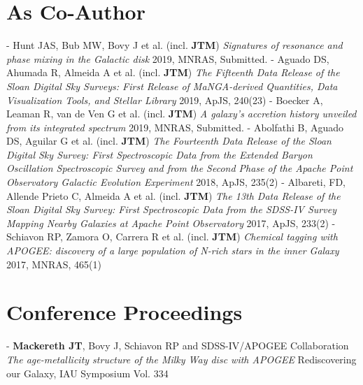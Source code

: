 \documentclass[margin]{res}
\begin{document}
\begin{resume}
\section{As Co-Author}
- Hunt JAS, Bub MW, Bovy J et al. (incl. \textbf{JTM}) \emph{Signatures of resonance and phase mixing in the Galactic disk} 2019, MNRAS, Submitted.
\newline - Aguado DS, Ahumada R, Almeida A et al. (incl. \textbf{JTM}) \emph{The Fifteenth Data Release of the Sloan Digital Sky Surveys: First Release of MaNGA-derived Quantities, Data Visualization Tools, and Stellar Library} 2019, ApJS, 240(23)
\newline - Boecker A, Leaman R, van de Ven G et al. (incl. \textbf{JTM}) \emph{A galaxy's accretion history unveiled from its integrated spectrum} 2019, MNRAS, Submitted.
\newline - Abolfathi B, Aguado DS, Aguilar G et al. (incl. \textbf{JTM}) \emph{The Fourteenth Data Release of the Sloan Digital Sky Survey: First Spectroscopic Data from the Extended Baryon Oscillation Spectroscopic Survey and from the Second Phase of the Apache Point Observatory Galactic Evolution Experiment} 2018, ApJS, 235(2)
\newline - Albareti, FD, Allende Prieto C, Almeida A et al. (incl. \textbf{JTM}) \emph{The 13th Data Release of the Sloan Digital Sky Survey: First Spectroscopic Data from the SDSS-IV Survey Mapping Nearby Galaxies at Apache Point Observatory} 2017, ApJS, 233(2)
\newline - Schiavon RP, Zamora O, Carrera R et al. (incl. \textbf{JTM}) \emph{Chemical tagging with APOGEE: discovery of a large population of N-rich stars in the inner Galaxy} 2017, MNRAS, 465(1)

\section{Conference Proceedings}
- \textbf{Mackereth JT}, Bovy J, Schiavon RP and SDSS-IV/APOGEE Collaboration \emph{The age-metallicity structure of the Milky Way disc with APOGEE} Rediscovering our Galaxy, IAU Symposium Vol. 334

\end{resume}
\end{document}
